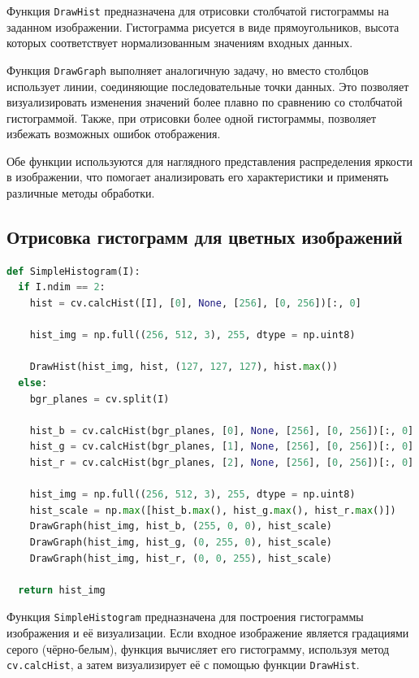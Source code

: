 \documentclass[a4paper,12pt]{article}
\begin{document}
Функция \texttt{DrawHist} предназначена для отрисовки столбчатой гистограммы на заданном изображении. Гистограмма рисуется в виде прямоугольников, высота которых соответствует нормализованным значениям входных данных.

Функция \texttt{DrawGraph} выполняет аналогичную задачу, но вместо столбцов использует линии, соединяющие последовательные точки данных. Это позволяет визуализировать изменения значений более плавно по сравнению со столбчатой гистограммой. Также, при отрисовки более одной гистограммы, позволяет избежать возможных ошибок отображения. 

Обе функции используются для наглядного представления распределения яркости в изображении, 
что помогает анализировать его характеристики и применять различные методы обработки.

\subsection{Отрисовка гистограмм для цветных изображений}
\begin{lstlisting}[language=Python, caption=Отрисовка RGB- и кумулятивной гистограмм]
def SimpleHistogram(I):
  if I.ndim == 2:
    hist = cv.calcHist([I], [0], None, [256], [0, 256])[:, 0]

    hist_img = np.full((256, 512, 3), 255, dtype = np.uint8)
    
    DrawHist(hist_img, hist, (127, 127, 127), hist.max())
  else:
    bgr_planes = cv.split(I)

    hist_b = cv.calcHist(bgr_planes, [0], None, [256], [0, 256])[:, 0]
    hist_g = cv.calcHist(bgr_planes, [1], None, [256], [0, 256])[:, 0]
    hist_r = cv.calcHist(bgr_planes, [2], None, [256], [0, 256])[:, 0]

    hist_img = np.full((256, 512, 3), 255, dtype = np.uint8)
    hist_scale = np.max([hist_b.max(), hist_g.max(), hist_r.max()])
    DrawGraph(hist_img, hist_b, (255, 0, 0), hist_scale)
    DrawGraph(hist_img, hist_g, (0, 255, 0), hist_scale)
    DrawGraph(hist_img, hist_r, (0, 0, 255), hist_scale)

  return hist_img
\end{lstlisting}


Функция \texttt{SimpleHistogram} предназначена для построения гистограммы изображения и её визуализации.
Если входное изображение является градациями серого (чёрно-белым), функция вычисляет его гистограмму, используя метод \texttt{cv.calcHist}, а затем визуализирует её с помощью функции \texttt{DrawHist}.
\end{document}
